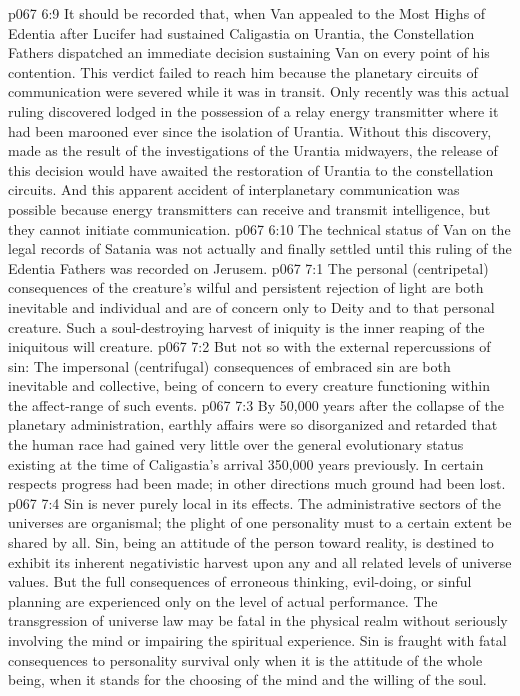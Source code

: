 \vs p067 6:9 \pc It should be recorded that, when Van appealed to the Most Highs of Edentia after Lucifer had sustained Caligastia on Urantia, the Constellation Fathers dispatched an immediate decision sustaining Van on every point of his contention. This verdict failed to reach him because the planetary circuits of communication were severed while it was in transit. Only recently was this actual ruling discovered lodged in the possession of a relay energy transmitter where it had been marooned ever since the isolation of Urantia. Without this discovery, made as the result of the investigations of the Urantia midwayers, the release of this decision would have awaited the restoration of Urantia to the constellation circuits. And this apparent accident of interplanetary communication was possible because energy transmitters can receive and transmit intelligence, but they cannot initiate communication.
\vs p067 6:10 The technical status of Van on the legal records of Satania was not actually and finally settled until this ruling of the Edentia Fathers was recorded on Jerusem.
\vs p067 7:1 The personal (centripetal) consequences of the creature’s wilful and persistent rejection of light are both inevitable and individual and are of concern only to Deity and to that personal creature. Such a soul\hyp{}destroying harvest of iniquity is the inner reaping of the iniquitous will creature.
\vs p067 7:2 But not so with the external repercussions of sin: The impersonal (centrifugal) consequences of embraced sin are both inevitable and collective, being of concern to every creature functioning within the affect\hyp{}range of such events.
\vs p067 7:3 By 50,000 years after the collapse of the planetary administration, earthly affairs were so disorganized and retarded that the human race had gained very little over the general evolutionary status existing at the time of Caligastia’s arrival 350,000 years previously. In certain respects progress had been made; in other directions much ground had been lost.
\vs p067 7:4 Sin is never purely local in its effects. The administrative sectors of the universes are organismal; the plight of one personality must to a certain extent be shared by all. Sin, being an attitude of the person toward reality, is destined to exhibit its inherent negativistic harvest upon any and all related levels of universe values. But the full consequences of erroneous thinking, evil\hyp{}doing, or sinful planning are experienced only on the level of actual performance. The transgression of universe law may be fatal in the physical realm without seriously involving the mind or impairing the spiritual experience. Sin is fraught with fatal consequences to personality survival only when it is the attitude of the whole being, when it stands for the choosing of the mind and the willing of the soul.

